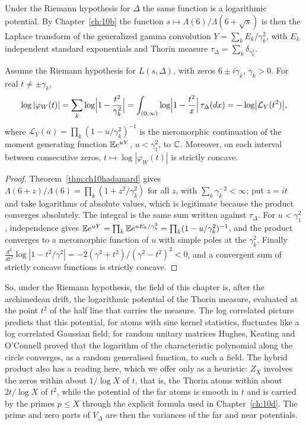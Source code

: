 Under the Riemann hypothesis for $\Delta$ the same function is a logarithmic potential. By Chapter~\ref{ch:10b} the function $s\mapsto\Lambda(6)/\Lambda(6+\sqrt s)$ is then the Laplace transform of the generalized gamma convolution $Y=\sum_kE_k/\gamma_k^2$, with $E_k$ independent standard exponentials and Thorin measure $\tau_\Delta=\sum_k\delta_{\gamma_k^2}$.

\begin{proposition}\label{prop:09bpotential}
Assume the Riemann hypothesis for $L(s,\Delta)$, with zeros $6\pm i\gamma_k$, $\gamma_k>0$. For real $t\ne\pm\gamma_k$,
\[
\log|\varphi_W(t)|=\sum_k\log\Bigl|1-\frac{t^2}{\gamma_k^2}\Bigr|=\int_{(0,\infty)}\log\Bigl|1-\frac{t^2}{x}\Bigr|\,\tau_\Delta(dx)=-\log\bigl|\mathcal{L}_Y(t^2)\bigr|,
\]
where $\mathcal{L}_Y(u)=\prod_k(1-u/\gamma_k^2)^{-1}$ is the meromorphic continuation of the moment generating function $\mathbb{E} e^{uY}$, $u<\gamma_1^2$, to $\mathbb{C}$. Moreover, on each interval between consecutive zeros, $t\mapsto\log|\varphi_W(t)|$ is strictly concave.
\end{proposition}

\begin{proof}
Theorem~\ref{thm:ch10hadamard} gives $\Lambda(6+z)/\Lambda(6)=\prod_k(1+z^2/\gamma_k^2)$ for all $z$, with $\sum_k\gamma_k^{-2}<\infty$; put $z=it$ and take logarithms of absolute values, which is legitimate because the product converges absolutely. The integral is the same sum written against $\tau_\Delta$. For $u<\gamma_1^2$, independence gives $\mathbb{E} e^{uY}=\prod_k\mathbb{E} e^{uE_k/\gamma_k^2}=\prod_k(1-u/\gamma_k^2)^{-1}$, and the product converges to a meromorphic function of $u$ with simple poles at the $\gamma_k^2$. Finally $\frac{d^2}{dt^2}\log|1-t^2/\gamma^2|=-2(\gamma^2+t^2)/(\gamma^2-t^2)^2<0$, and a convergent sum of strictly concave functions is strictly concave.
\end{proof}

So, under the Riemann hypothesis, the field of this chapter is, after the archimedean drift, the logarithmic potential of the Thorin measure, evaluated at the point $t^2$ of the half line that carries the measure. The log correlated picture predicts that this potential, for atoms with sine kernel statistics, fluctuates like a log correlated Gaussian field; for random unitary matrices Hughes, Keating and O'Connell \cite{hko2001} proved that the logarithm of the characteristic polynomial along the circle converges, as a random generalised function, to such a field. The hybrid product also has a reading here, which we offer only as a heuristic: $Z_X$ involves the zeros within about $1/\log X$ of $t$, that is, the Thorin atoms within about $2t/\log X$ of $t^2$, while the potential of the far atoms is smooth in $t$ and is carried by the primes $p\le X$ through the explicit formula used in Chapter~\ref{ch:10d}. The prime and zero parts of $V_\Delta$ are then the variances of the far and near potentials.

